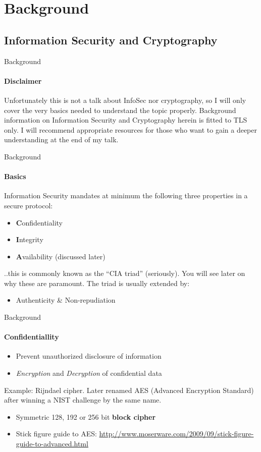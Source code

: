 \documentclass[hyperref={draft}]{beamer}
\begin{document}
\section{Background}


\subsection{Information Security and Cryptography}

\begin{frame}{Background}
  \framesubtitle{Disclaimer}
  Unfortunately this is not a talk about InfoSec nor cryptography, so I will only cover the very basics needed to understand the topic properly. Background information on Information Security and Cryptography herein is fitted to TLS only.
  \newline
  \newline
  I will recommend appropriate resources for those who want to gain a deeper understanding at the end of my talk.
\end{frame}

\begin{frame}{Background}
  \framesubtitle{Basics}
  Information Security mandates at minimum the following three properties in a secure protocol:
  \begin{itemize}
    \item \textbf{C}onfidentiality
    \item \textbf{I}ntegrity
    \item \textbf{A}vailability (discussed later)
  \end{itemize}
  ..this is commonly known as the ``CIA triad'' (seriously). You will see later on why these are paramount. The triad is usually extended by:
  \begin{itemize}
    \item Authenticity \& Non-repudiation
  \end{itemize}
\end{frame}

\begin{frame}{Background}
  \framesubtitle{Confidentiallity}
  \begin{itemize}
    \item Prevent unauthorized disclosure of information
    \item \emph{Encryption} and \emph{Decryption} of confidential data
  \end{itemize}
  Example: Rijndael cipher. Later renamed AES (Advanced Encryption Standard) after winning a NIST challenge by the same name.
  \begin{itemize}
    \item Symmetric 128, 192 or 256 bit \textbf{block cipher} 
    \item Stick figure guide to AES: \url{http://www.moserware.com/2009/09/stick-figure-guide-to-advanced.html}
  \end{itemize}
\end{frame}
\end{document}
